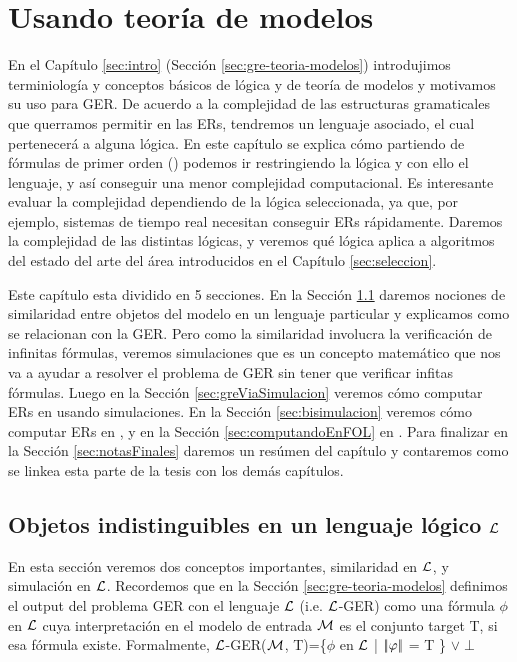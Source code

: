 \chapter{Usando teor\'ia de modelos}
\label{sec:intro_logica}

En el Cap\'itulo \ref{sec:intro} (Secci\'on \ref{sec:gre-teoria-modelos}) introdujimos terminiolog\'ia y conceptos b\'asicos de l\'ogica y de teor\'ia de modelos y motivamos su uso para GER.
De acuerdo a la complejidad de las estructuras gramaticales que querramos permitir en las ERs, tendremos un lenguaje asociado, 
el cual pertenecer\'a a alguna l\'ogica. En este cap\'itulo se explica c\'omo partiendo de f\'ormulas de primer orden (\FOL) 
podemos ir restringiendo la l\'ogica y con ello el lenguaje, y as\'i conseguir una menor complejidad computacional. Es interesante evaluar la complejidad dependiendo de la l\'ogica seleccionada, 
ya que, por ejemplo, sistemas de tiempo real necesitan conseguir ERs r\'apidamente. Daremos la complejidad de las distintas l\'ogicas, 
y veremos qu\'e l\'ogica aplica a algoritmos del estado del arte del \'area introducidos en el Cap\'itulo \ref{sec:seleccion}.

Este cap\'itulo esta dividido en 5 secciones. En la Secci\'on \ref{sec:seleccionandoLenguaje} daremos nociones de similaridad entre objetos del modelo en un lenguaje particular y explicamos como se relacionan con la GER. Pero como la similaridad involucra la verificaci\'on de infinitas f\'ormulas, veremos simulaciones que es un concepto matem\'atico que nos va a ayudar a resolver el problema de GER sin tener que verificar infitas f\'ormulas. Luego en la Secci\'on \ref{sec:greViaSimulacion} veremos c\'omo computar ERs en \EL usando simulaciones. En la Secci\'on \ref{sec:bisimulacion} veremos c\'omo computar ERs en \ALC, y en la Secci\'on \ref{sec:computandoEnFOL} en \FOL. Para finalizar en la Secci\'on \ref{sec:notasFinales} daremos un res\'umen del cap\'itulo y contaremos como se linkea esta parte de la tesis con los dem\'as cap\'itulos.


\section{Objetos indistinguibles en un lenguaje l\'ogico $\mathcal{L}$}
\label{sec:seleccionandoLenguaje}

En esta secci\'on veremos dos conceptos importantes, similaridad en $\mathcal{L}$, y simulaci\'on en $\mathcal{L}$. Recordemos que en la Secci\'on \ref{sec:gre-teoria-modelos} definimos el output del problema GER con el lenguaje $\mathcal{L}$ (i.e. $\mathcal{L}$-GER) como una f\'ormula $\phi$ en $\mathcal{L}$ cuya interpretaci\'on en el modelo de entrada  $\mathcal{M}$ es el conjunto target T, si esa f\'ormula existe. Formalmente, $\mathcal{L}$-GER($\mathcal{M}$, T)=\{$\phi$ en $\mathcal{L}$ | $|\!|\varphi|\!|$ = T \} $\lor \perp$

